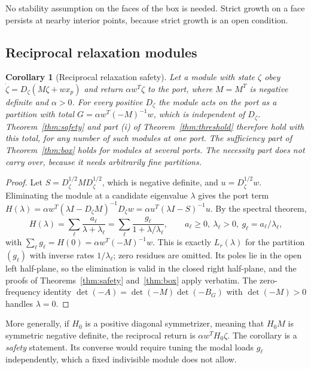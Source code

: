 \documentclass[11pt,a4paper]{article}
\theoremstyle{plain}
\newtheorem{corollary}[theorem]{Corollary}
\theoremstyle{definition}
\theoremstyle{remark}
\begin{document}
No stability assumption on the faces of the box is needed. Strict growth on a
face persists at nearby interior points, because strict growth is an open
condition.

\subsection{Reciprocal relaxation modules}

\begin{corollary}[Reciprocal relaxation safety]\label{cor:relax}
Let a module with state $\zeta$ obey $\dot\zeta=D_\zeta(M\zeta+wx_p)$ and return
$\alpha w^{T}\zeta$ to the port, where $M=M^{T}$ is negative definite and
$\alpha>0$. For every positive $D_\zeta$ the module acts on the port as a
partition with total $G=\alpha w^{T}(-M)^{-1}w$, which is independent of
$D_\zeta$. Theorem~\ref{thm:safety} and part (i) of
Theorem~\ref{thm:threshold} therefore hold with this total, for any number of
such modules at one port. The sufficiency part of Theorem~\ref{thm:box} holds for modules at several
ports. The necessity part does not carry over, because it needs arbitrarily
fine partitions.
\end{corollary}
\begin{proof}
Let $S=D_\zeta^{1/2}MD_\zeta^{1/2}$, which is negative definite, and
$u=D_\zeta^{1/2}w$. Eliminating the module at a candidate eigenvalue $\lambda$
gives the port term
$H(\lambda)=\alpha w^{T}(\lambda I-D_\zeta M)^{-1}D_\zeta w=\alpha u^{T}(\lambda I-S)^{-1}u$.
By the spectral theorem,
\[
 H(\lambda)=\sum_\ell\frac{a_\ell}{\lambda+\lambda_\ell}=\sum_\ell\frac{g_\ell}{1+\lambda/\lambda_\ell},
 \qquad a_\ell\ge0,\ \lambda_\ell>0,\ g_\ell=a_\ell/\lambda_\ell,
\]
with $\sum_\ell g_\ell=H(0)=\alpha w^{T}(-M)^{-1}w$. This is exactly
$L_r(\lambda)$ for the partition $(g_\ell)$ with inverse rates $1/\lambda_\ell$;
zero residues are omitted. Its poles lie in the open left half-plane, so the
elimination is valid in the closed right half-plane, and the proofs of
Theorems~\ref{thm:safety} and~\ref{thm:box} apply verbatim. The zero-frequency
identity $\det(-A)=\det(-M)\det(-B_G)$ with $\det(-M)>0$ handles
$\lambda=0$.
\end{proof}

More generally, if $H_0$ is a positive diagonal symmetrizer, meaning that
$H_0M$ is symmetric negative definite, the reciprocal return is
$\alpha w^{T}H_0\zeta$. The corollary is a \emph{safety} statement. Its converse
would require tuning the modal loads $g_\ell$ independently, which a fixed
indivisible module does not allow.
\end{document}

